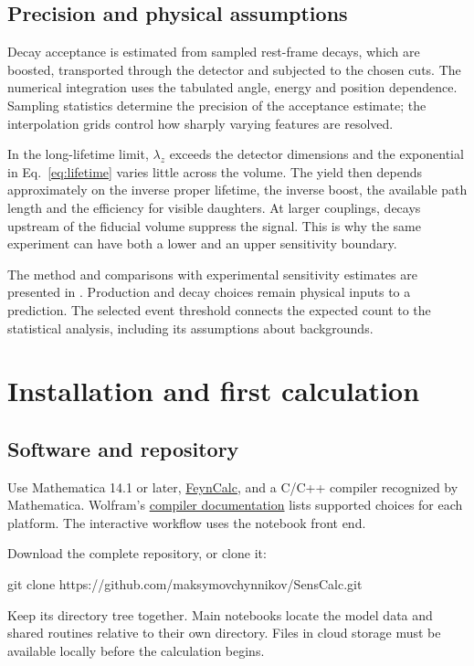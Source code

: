 \subsection{Precision and physical assumptions}
Decay acceptance is estimated from sampled rest-frame decays, which are boosted, transported through the detector and subjected to the chosen cuts. The numerical integration uses the tabulated angle, energy and position dependence. Sampling statistics determine the precision of the acceptance estimate; the interpolation grids control how sharply varying features are resolved.

In the long-lifetime limit, $\lambda_z$ exceeds the detector dimensions and the exponential in Eq.~\eqref{eq:lifetime} varies little across the volume. The yield then depends approximately on the inverse proper lifetime, the inverse boost, the available path length and the efficiency for visible daughters. At larger couplings, decays upstream of the fiducial volume suppress the signal. This is why the same experiment can have both a lower and an upper sensitivity boundary.

The method and comparisons with experimental sensitivity estimates are presented in . Production and decay choices remain physical inputs to a prediction. The selected event threshold connects the expected count to the statistical analysis, including its assumptions about backgrounds.

\section{Installation and first calculation}\label{sec:start}
\subsection{Software and repository}
Use Mathematica 14.1 or later, \href{https://feyncalc.github.io/}{FeynCalc}, and a C/C++ compiler recognized by Mathematica. Wolfram's \href{https://reference.wolfram.com/language/CCompilerDriver/tutorial/SpecificCompilers.html}{compiler documentation} lists supported choices for each platform. The interactive workflow uses the notebook front end.

Download the complete repository, or clone it:
\begin{Code}
git clone https://github.com/maksymovchynnikov/SensCalc.git
\end{Code}
Keep its directory tree together. Main notebooks locate the model data and shared routines relative to their own directory. Files in cloud storage must be available locally before the calculation begins.

